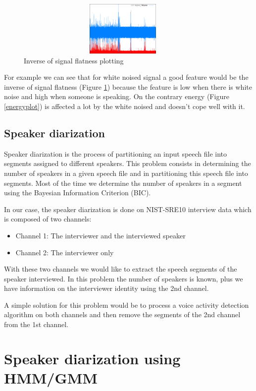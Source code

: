\documentclass{techrep} %
\begin{document}
\begin{figure}[H]
  \centering \includegraphics[width=400px,
    height=100px]{signal_flatness}
  \caption{Inverse of signal flatness plotting}
  \label{signalflatness}
\end{figure}

For example we can see that for white noised signal a good feature
would be the inverse of signal flatness (Figure \ref{signalflatness})
because the feature is low when there is white noise and high when
someone is speaking. On the contrary energy (Figure \ref{energyplot})
is affected a lot by the white noised and doesn't cope well with it.

\section{Speaker diarization}
Speaker diarization is the process of partitioning an input speech
file into segments assigned to different speakers. This problem
consists in determining the number of speakers in a given speech file
and in partitioning this speech file into segments.  Most of the time
we determine ths number of speakers in a segment using the Bayesian Information
Criterion (BIC).

In our case, the speaker diarization is done on NIST-SRE10 interview
data which is composed of two channels:
\begin{itemize}
\item Channel 1: The interviewer and the interviewed speaker
\item Channel 2: The interviewer only
\end{itemize}
With these two channels we would like to extract the speech segments
of the speaker interviewed. In this problem the number of speakers is
known, plus we have information on the interviewer identity using the
2nd channel.

A simple solution for this problem would be to process a
voice activity detection algorithm on both channels and then remove
the segments of the 2nd channel from the 1st channel.

\chapter{Speaker diarization using HMM/GMM}
\end{document}
